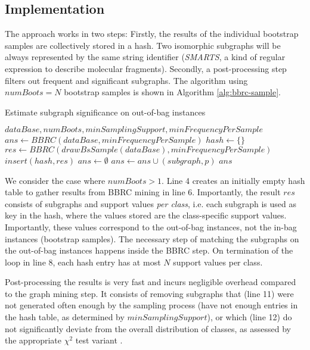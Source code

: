\documentclass{article}
\begin{document}
\subsection{Implementation}
The approach works in two steps: Firstly, the results of the individual bootstrap samples are collectively stored in a hash. Two isomorphic subgraphs will be always represented by the same string identifier (\emph{SMARTS}, a kind of regular expression to describe molecular fragments). Secondly, a post-processing step filters out frequent and significant subgraphs. The algorithm using $numBoots=N$ bootstrap samples is shown in Algorithm \ref{alg:bbrc-sample}.
\renewcommand{\algorithmicrequire}{\textbf{Input:}}
\renewcommand{\algorithmicensure}{\textbf{Output:}}
\begin{algorithm}
  \caption{Estimate subgraph significance on out-of-bag instances}
  \label{alg:bbrc-sample}
\begin{algorithmic}[1]
  \Require $dataBase, numBoots, minSamplingSupport, minFrequencyPerSample$
    \State $ans \gets BBRC(dataBase, minFrequencyPerSample)$
  \Else
    \State $hash \gets \{\}$
     
        \State $res \gets BBRC(drawBsSample(dataBase), minFrequencyPerSample)$
      \State $insert(hash,res)$
    \EndFor
    \State $ans \gets \emptyset$
          \State $ans\gets ans \cup (subgraph,p)$
        \EndIf
      \EndIf
    \EndFor
  \EndIf
  \Ensure $ans$
\end{algorithmic}
\end{algorithm}

We consider the case where $numBoots>1$. Line 4 creates an initially empty hash table to gather results from BBRC mining
in line 6. Importantly, the result $res$ consists of subgraphs and support
values \emph{per class}, i.e. each subgraph is used as key in the hash, where
the values stored are the class-specific support values. Importantly, these
values correspond to the out-of-bag instances, not the in-bag instances
(bootstrap samples). The necessary step of matching the subgraphs on the
out-of-bag instances happens inside the BBRC step. On termination of the loop
in line 8, each hash entry has at most $N$ support values per class.

Post-processing the results is very fast and incurs negligible overhead
compared to the graph mining step. It consists of removing subgraphs that (line
11) were not generated often enough by the sampling process (have not enough
entries in the hash table, as determined by $minSamplingSupport$), or which
(line 12) do not significantly deviate from the overall distribution of classes,
as assessed by the appropriate $\chi^2$ test variant .
\end{document}
